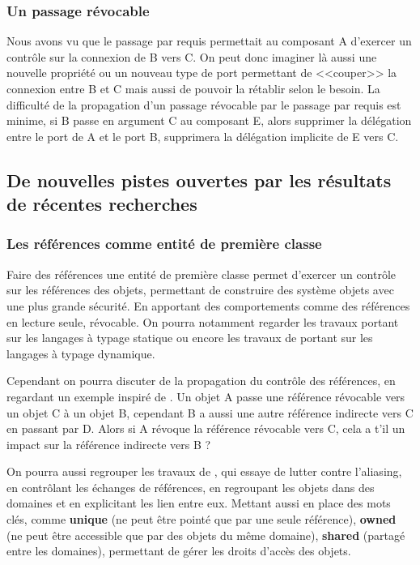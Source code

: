       \subsubsection{Un passage révocable}
    
    Nous avons vu que le passage par requis permettait au composant A d'exercer un contrôle sur la connexion de B vers C. On peut donc imaginer là aussi une nouvelle propriété ou un nouveau type de port permettant de <<couper>> la connexion entre B et C mais aussi de pouvoir la rétablir selon le besoin. La difficulté de la propagation d'un passage révocable par le passage par requis est minime, si B passe en argument C au composant E, alors supprimer la délégation entre le port de A et le port B, supprimera la délégation implicite de E vers C. \\\par
    
  \subsection{De nouvelles pistes ouvertes par les résultats de récentes recherches}
  
    \subsubsection{Les références comme entité de première classe}
    
    Faire des références une entité de première classe permet d'exercer un contrôle sur les références des objets, permettant de construire des système objets avec une plus grande sécurité. En apportant des comportements comme des références en lecture seule, révocable. On pourra notamment regarder les travaux portant sur les langages à typage statique \cite{clarke1998ownership} ou encore les travaux de \cite{arnaudhandles} portant sur les langages à typage dynamique. 
    
    Cependant on pourra discuter de la propagation du contrôle des références, en regardant un exemple inspiré de \cite{arnaudhandles}. Un objet A passe une référence révocable vers un objet C à un objet B, cependant B a aussi une autre référence indirecte vers C en passant par D. Alors si A révoque la référence révocable vers C, cela a t'il un impact sur la référence indirecte vers B ?
    
    On pourra aussi regrouper les travaux de \cite{abi2006javad}, qui essaye de lutter contre l'aliasing, en contrôlant les échanges de références, en regroupant les objets dans des domaines et en explicitant les lien entre eux. Mettant aussi en place des mots clés, comme \textbf{unique} (ne peut être pointé que par une seule référence), \textbf{owned} (ne peut être accessible que par des objets du même domaine), \textbf{shared} (partagé entre les domaines), permettant de gérer les droits d'accès des objets.
    
